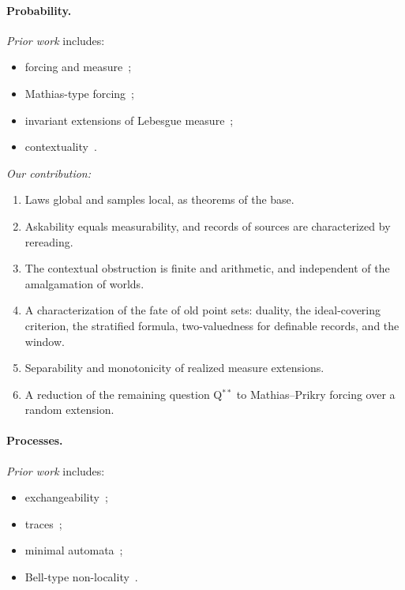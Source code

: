 \documentclass[11pt]{article}
\theoremstyle{definition}
\theoremstyle{remark}
\begin{document}
\paragraph{Probability.}
\emph{Prior work} includes:
\begin{itemize}
\item forcing and measure~\cite{Solovay70,BartoszynskiJudah95};
\item Mathias-type forcing~\cite{Mathias77,HrusakMinami14};
\item invariant extensions of Lebesgue measure~\cite{Szpilrajn35,KakutaniOxtoby50};
\item contextuality~\cite{Abramsky11}.
\end{itemize}

\noindent \emph{Our contribution:}
\begin{enumerate}
\item Laws global and samples local, as theorems of the base.
\item Askability equals measurability, and records of sources are characterized by rereading.
\item The contextual obstruction is finite and arithmetic, and independent of the amalgamation of worlds.
\item A characterization of the fate of old point sets: duality, the ideal-covering criterion, the stratified formula, two-valuedness for definable records, and the window.
\item Separability and monotonicity of realized measure extensions.
\item A reduction of the remaining question Q$^{**}$ to Mathias--Prikry forcing over a random extension.
\end{enumerate}

\paragraph{Processes.}
\emph{Prior work} includes:
\begin{itemize}
\item exchangeability~\cite{deFinetti37,HewittSavage55,DiaconisFreedman80};
\item traces~\cite{Mazurkiewicz77,DiekertRozenberg95};
\item minimal automata~\cite{Myhill57,Nerode58};
\item Bell-type non-locality~\cite{Bell64,PopescuRohrlich94}.
\end{itemize}
\end{document}
